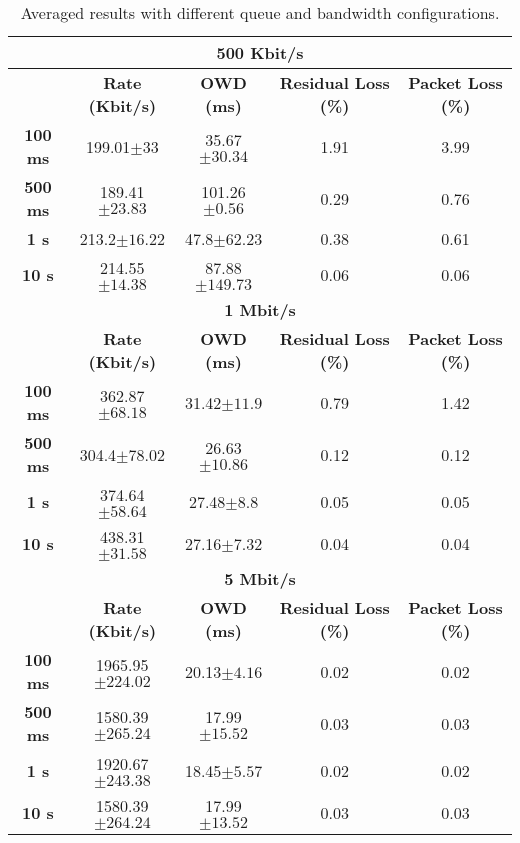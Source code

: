 \documentclass[11pt]{amsart}
\begin{document}
\begin{table}[h]
\begin{center}
\begin{tabular}{ |c|c|c|c|c| }
\hline
\multicolumn{5}{|c|}{\textbf{500 Kbit/s}} \\ \hline
 & \textbf{Rate (Kbit/s)}  & \textbf{OWD (ms)} & \textbf{Residual Loss (\%)} & \textbf{Packet Loss (\%)}\\ \hline
 \textbf{100 ms} & 199.01$\pm33$ &  35.67$\pm30.34$ & 1.91 & 3.99 \\ \hline
 \textbf{500 ms} & 189.41$\pm23.83$ & 101.26$\pm0.56$ & 0.29 & 0.76 \\ \hline
 \textbf{1 s} & 213.2$\pm16.22$ & 47.8$\pm62.23$ & 0.38 & 0.61 \\ \hline
 \textbf{10 s} & 214.55$\pm14.38$ &  87.88$\pm149.73$ & 0.06 & 0.06 \\ \hline
 \multicolumn{5}{|c|}{\textbf{1 Mbit/s}} \\ \hline
 & \textbf{Rate (Kbit/s)}  & \textbf{OWD (ms)} & \textbf{Residual Loss (\%)} & \textbf{Packet Loss (\%)}\\ \hline
 \textbf{100 ms} & 362.87$\pm68.18$ & 31.42$\pm11.9$ & 0.79 & 1.42 \\ \hline
 \textbf{500 ms} & 304.4$\pm78.02$ & 26.63$\pm10.86$ & 0.12 & 0.12 \\ \hline
 \textbf{1 s} &  374.64$\pm58.64$ &  27.48$\pm8.8$ & 0.05 & 0.05 \\ \hline
 \textbf{10 s} & 438.31$\pm31.58$ & 27.16$\pm7.32$ & 0.04 & 0.04 \\ \hline
 \multicolumn{5}{|c|}{\textbf{5 Mbit/s}} \\ \hline
 & \textbf{Rate (Kbit/s)}  & \textbf{OWD (ms)} & \textbf{Residual Loss (\%)} & \textbf{Packet Loss (\%)}\\ \hline
 \textbf{100 ms} & 1965.95$\pm224.02$ &   20.13$\pm4.16$ & 0.02 & 0.02 \\ \hline
 \textbf{500 ms} & 1580.39$\pm265.24$ & 17.99$\pm15.52$ & 0.03 & 0.03 \\ \hline
 \textbf{1 s} & 1920.67$\pm243.38$ &18.45$\pm5.57$ & 0.02 & 0.02 \\ \hline
 \textbf{10 s} &  1580.39$\pm264.24$ & 17.99$\pm13.52$ & 0.03 & 0.03 \\ \hline
\end{tabular}
    \caption[Averaged results with different queue and bandwidth configurations]{Averaged results with different queue and bandwidth configurations.}
\end{center}
\end{table}
\end{document}
